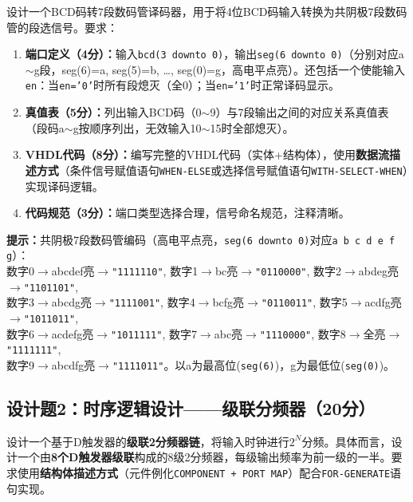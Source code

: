 设计一个BCD码转7段数码管译码器，用于将4位BCD码输入转换为共阴极7段数码管的段选信号。要求：

\begin{enumerate}[label=(\arabic*)]
  \item \textbf{端口定义（4分）：}输入\texttt{bcd(3~downto~0)}，输出\texttt{seg(6~downto~0)}（分别对应a$\sim$g段，seg(6)=a, seg(5)=b, \dots, seg(0)=g，高电平点亮）。还包括一个使能输入\texttt{en}：当\texttt{en='0'}时所有段熄灭（全0）；当\texttt{en='1'}时正常译码显示。
  \item \textbf{真值表（5分）：}列出输入BCD码（0$\sim$9）与7段输出之间的对应关系真值表（段码a$\sim$g按顺序列出，无效输入10$\sim$15时全部熄灭）。
  \item \textbf{VHDL代码（8分）：}编写完整的VHDL代码（实体+结构体），使用\textbf{数据流描述方式}（条件信号赋值语句\texttt{WHEN-ELSE}或选择信号赋值语句\texttt{WITH-SELECT-WHEN}）实现译码逻辑。
  \item \textbf{代码规范（3分）：}端口类型选择合理，信号命名规范，注释清晰。
\end{enumerate}

\begin{framed}
\textbf{提示：}共阴极7段数码管编码（高电平点亮，\texttt{seg(6~downto~0)}对应\texttt{a b c d e f g}）：\\
数字0$\rightarrow$abcdef亮$\rightarrow$\texttt{"1111110"}, 数字1$\rightarrow$bc亮$\rightarrow$\texttt{"0110000"}, 数字2$\rightarrow$abdeg亮$\rightarrow$\texttt{"1101101"}, \\
数字3$\rightarrow$abcdg亮$\rightarrow$\texttt{"1111001"}, 数字4$\rightarrow$bcfg亮$\rightarrow$\texttt{"0110011"}, 数字5$\rightarrow$acdfg亮$\rightarrow$\texttt{"1011011"}, \\
数字6$\rightarrow$acdefg亮$\rightarrow$\texttt{"1011111"}, 数字7$\rightarrow$abc亮$\rightarrow$\texttt{"1110000"}, 数字8$\rightarrow$全亮$\rightarrow$\texttt{"1111111"}, \\
数字9$\rightarrow$abcdfg亮$\rightarrow$\texttt{"1111011"}。以a为最高位(\texttt{seg(6)})，g为最低位(\texttt{seg(0)})。
\end{framed}

\subsection*{设计题2：时序逻辑设计——级联分频器（20分）}

设计一个基于D触发器的\textbf{级联2分频器链}，将输入时钟进行$2^N$分频。具体而言，设计一个由\textbf{8个D触发器级联}构成的8级2分频器，每级输出频率为前一级的一半。要求使用\textbf{结构体描述方式}（元件例化\texttt{COMPONENT + PORT MAP}）配合\texttt{FOR-GENERATE}语句实现。

